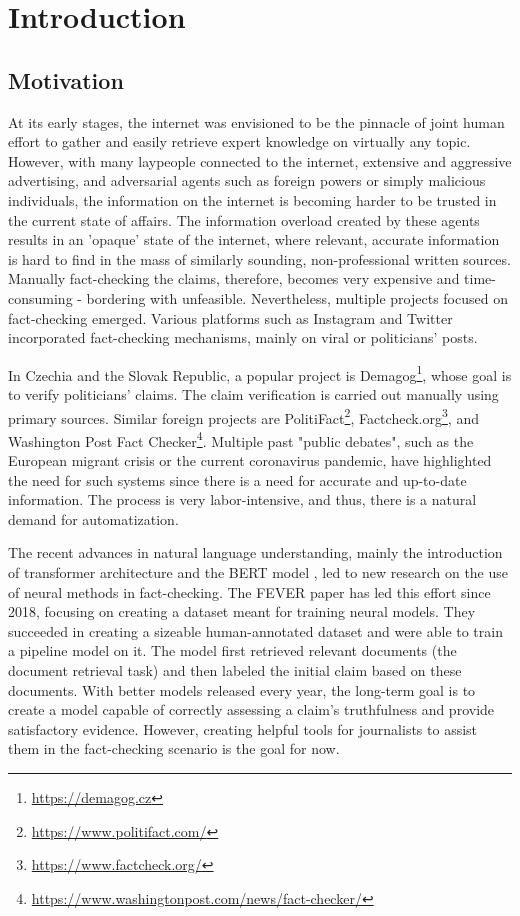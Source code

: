 \chapter*{Introduction}
\section*{Motivation}
At its early stages, the internet was envisioned to be the pinnacle of joint human effort to gather and easily retrieve expert knowledge on virtually any topic.
However, with many laypeople connected to the internet, extensive and aggressive advertising, and adversarial agents such as foreign powers or simply malicious individuals, the information on the internet is becoming harder to be trusted in the current state of affairs.
The information overload created by these agents results in an 'opaque' state of the internet, where relevant, accurate information is hard to find in the mass of similarly sounding, non-professional written sources.
Manually fact-checking the claims, therefore, becomes very expensive and time-consuming - bordering with unfeasible.
Nevertheless, multiple projects focused on fact-checking emerged. 
Various platforms such as Instagram and Twitter incorporated fact-checking mechanisms, mainly on viral or politicians' posts. 

In Czechia and the Slovak Republic, a popular project is Demagog\footnote{\url{https://demagog.cz}}, whose goal is to verify politicians' claims.
The claim verification is carried out manually using primary sources. 
Similar foreign projects are PolitiFact\footnote{\url{https://www.politifact.com/}}, Factcheck.org\footnote{\url{https://www.factcheck.org/}}, and Washington Post Fact Checker\footnote{\url{https://www.washingtonpost.com/news/fact-checker/}}.
Multiple past "public debates", such as the European migrant crisis or the current coronavirus pandemic, have highlighted the need for such systems since there is a need for accurate and up-to-date information.
The process is very labor-intensive, and thus, there is a natural demand for automatization.

The recent advances in natural language understanding, mainly the introduction of transformer architecture \citep{transformers-vaswani} and the BERT model \citep{bert}, led to new research on the use of neural methods in fact-checking.
The FEVER paper \citep{fever} has led this effort since 2018, focusing on creating a dataset meant for training neural models.
They succeeded in creating a sizeable human-annotated dataset and were able to train a pipeline model on it.
The model first retrieved relevant documents (the document retrieval task) and then labeled the initial claim based on these documents. 
With better models released every year, the long-term goal is to create a model capable of correctly assessing a claim's truthfulness and provide satisfactory evidence. However, creating helpful tools for journalists to assist them in the fact-checking scenario is the goal for now.

